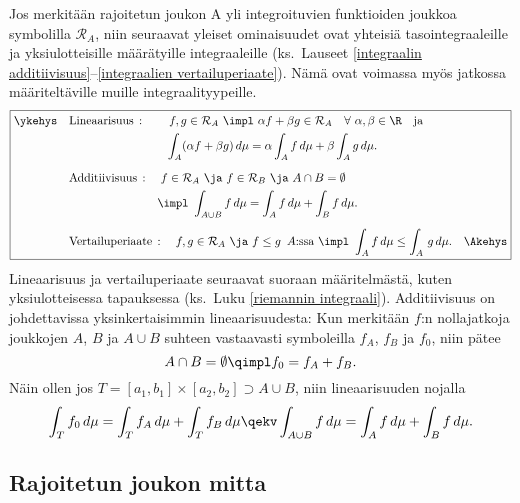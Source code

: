 Jos merkitään rajoitetun joukon A yli integroituvien funktioiden joukkoa symbolilla
$\mathcal{R}_A$, niin seuraavat yleiset ominaisuudet ovat yhteisiä tasointegraaleille ja 
yksiulotteisille määrätyille integraaleille (ks.\ Lauseet
\ref{integraalin additiivisuus}--\ref{integraalien vertailuperiaate}). Nämä ovat voimassa myös
jatkossa määriteltäville muille integraalityypeille.
%
\[ 
\boxed{ \begin{aligned}
\ykehys\quad &\text{Lineaarisuus}\,: \qquad 
f,g \in \mathcal{R}_A\ \impl\ \alpha f + \beta g \in \mathcal{R}_A \quad
                                         \forall\ \alpha,\beta \in \R \quad \text{ja} \\
&\phantom{\text{Lineaarisuus}\,:} \qquad 
\int_A (\alpha f + \beta g)\,d\mu = \alpha\int_A f\,d\mu + \beta\int_A g\,d\mu. \\[2mm]
&\text{Additiivisuus}\,: \quad 
f\in\mathcal{R}_A\ \ja\ f\in\mathcal{R}_B\ \ja\ A \cap B = \emptyset \\
&\phantom{\text{Additiivisuus}\,:} \quad \impl\ \int_{A \cup B} f\,d\mu 
                                              = \int_A f\,d\mu + \int_B f\,d\mu. \\[2mm]
&\text{Vertailuperiaate}\,: \quad 
f,g \in \mathcal{R}_A\ \ja\ f \le g\,\ A\text{:ssa}\ \impl\ \int_A f\,d\mu \le \int_A\,g\,d\mu. 
        \quad\Akehys \end{aligned} } 
\]
Lineaarisuus ja vertailuperiaate seuraavat suoraan määritelmästä, kuten yksi\-ulotteisessa
tapauksessa (ks.\ Luku \ref{riemannin integraali}). Additiivisuus on johdettavissa
yksinkertaisimmin lineaarisuudesta: Kun merkitään $f$:n nollajatkoja joukkojen $A$, $B$ ja
$A \cup B$ suhteen vastaavasti symboleilla $f_A$, $f_B$ ja $f_0$, niin pätee
\[
A \cap B = \emptyset \qimpl f_0=f_A+f_B.
\]
Näin ollen jos $T=[a_1,b_1]\times[a_2,b_2] \supset A \cup B$, niin lineaarisuuden nojalla
\[
\int_T f_0\,d\mu = \int_T f_A\,d\mu + \int_T f_B\,d\mu
   \qekv \int_{A \cup B} f\,d\mu = \int_A f\,d\mu + \int_B f\,d\mu.
\]

\subsection{Rajoitetun joukon mitta}

